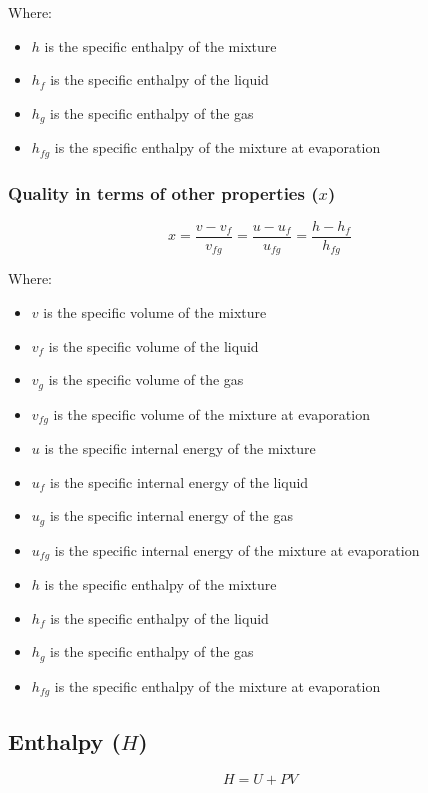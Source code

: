 \documentclass[11pt]{article}
\begin{document}
Where:
\begin{itemize}
\item \(h\) is the specific enthalpy of the mixture
\item \(h_f\) is the specific enthalpy of the liquid
\item \(h_g\) is the specific enthalpy of the gas
\item \(h_{fg}\) is the specific enthalpy of the mixture at evaporation
\end{itemize}

\newpage

\subsubsection{Quality in terms of other properties (\(x\))}
\label{sec:orgb8e67cc}
\[x = \frac{v - v_f}{v_{fg}} = \frac{u - u_f}{u_{fg}} = \frac{h - h_f}{h_{fg}}\]

Where:
\begin{itemize}
\item \(v\) is the specific volume of the mixture
\item \(v_f\) is the specific volume of the liquid
\item \(v_g\) is the specific volume of the gas
\item \(v_{fg}\) is the specific volume of the mixture at evaporation
\item \(u\) is the specific internal energy of the mixture
\item \(u_f\) is the specific internal energy of the liquid
\item \(u_g\) is the specific internal energy of the gas
\item \(u_{fg}\) is the specific internal energy of the mixture at evaporation
\item \(h\) is the specific enthalpy of the mixture
\item \(h_f\) is the specific enthalpy of the liquid
\item \(h_g\) is the specific enthalpy of the gas
\item \(h_{fg}\) is the specific enthalpy of the mixture at evaporation
\end{itemize}

\newpage

\subsection{Enthalpy (\(H\))}
\label{sec:orga0161b4}
\[H = U + PV\]
\end{document}
